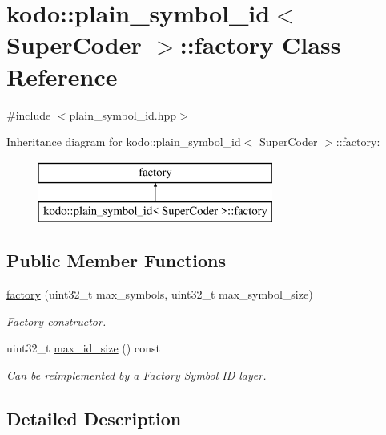 \hypertarget{classkodo_1_1plain__symbol__id_1_1factory}{\section{kodo\-:\-:plain\-\_\-symbol\-\_\-id$<$ Super\-Coder $>$\-:\-:factory Class Reference}
\label{classkodo_1_1plain__symbol__id_1_1factory}
}


{\ttfamily \#include $<$plain\-\_\-symbol\-\_\-id.\-hpp$>$}

Inheritance diagram for kodo\-:\-:plain\-\_\-symbol\-\_\-id$<$ Super\-Coder $>$\-:\-:factory\-:\begin{figure}[H]
\begin{center}
\leavevmode
\includegraphics[height=2.000000cm]{classkodo_1_1plain__symbol__id_1_1factory}
\end{center}
\end{figure}
\subsection*{Public Member Functions}
\begin{DoxyCompactItemize}
\item 
\hyperlink{classkodo_1_1plain__symbol__id_1_1factory_a228d741b1eafe7fbd1f93997797ddc5f}{factory} (uint32\-\_\-t max\-\_\-symbols, uint32\-\_\-t max\-\_\-symbol\-\_\-size)
\begin{DoxyCompactList}\small\item\em Factory constructor. \end{DoxyCompactList}\item 
uint32\-\_\-t \hyperlink{classkodo_1_1plain__symbol__id_1_1factory_a42efa81938aad604a73597e161209567}{max\-\_\-id\-\_\-size} () const 
\begin{DoxyCompactList}\small\item\em Can be reimplemented by a Factory Symbol I\-D layer. \end{DoxyCompactList}\end{DoxyCompactItemize}


\subsection{Detailed Description}
